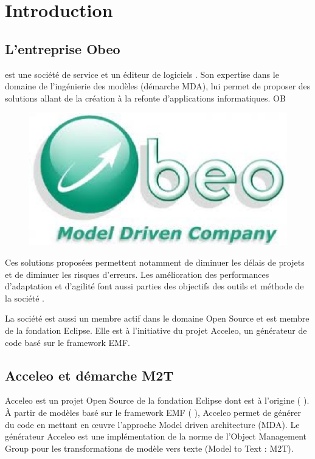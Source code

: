 \chapter{Introduction}\label{chap:Intro}

\section{L'entreprise Obeo}
\obeo{} est une société de service et un éditeur de logiciels \cite{obeo}. Son expertise dans le domaine de l'ingénierie des modèles (démarche MDA), lui permet de proposer des solutions allant de la création à la refonte d'applications informatiques. 
 OB
\begin{figure}[htb]
  \centering
  \includegraphics[scale=.4]{img/logoobeo.eps}
  \label{fig:obeo}
\end{figure}

Ces solutions proposées permettent notamment de diminuer les délais de projets et de diminuer les risques d'erreurs. Les amélioration des performances d'adaptation et d'agilité font aussi parties des objectifs des outils et méthode de la société \obeo{}.

La société \obeo{} est aussi un membre actif dans le domaine Open Source et est membre de la fondation Eclipse. Elle est à l'initiative du projet Acceleo, un générateur de code basé sur le framework EMF. 


\section{Acceleo et démarche M2T}
Acceleo est un projet Open Source de la fondation Eclipse dont \obeo{} est à l'origine (\cf{} \cite{acceleo}). À partir de modèles basé sur le framework EMF (\cf{} \cite{emf}), Acceleo permet de générer du code en mettant en œuvre l'approche Model driven architecture (MDA). Le générateur Acceleo est une implémentation de la norme de l'Object Management Group \cite{omg} pour les transformations de modèle vers texte (Model to Text : M2T).


